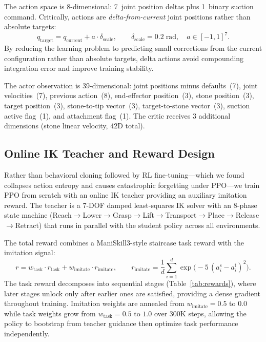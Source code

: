 \documentclass{article}
\begin{document}
The action space is 8-dimensional: 7~joint position deltas plus 1~binary suction command. Critically, actions are \emph{delta-from-current} joint positions rather than absolute targets:
\begin{equation}
q_{\mathrm{target}} = q_{\mathrm{current}} + a \cdot \delta_{\mathrm{scale}}, \qquad \delta_{\mathrm{scale}} = 0.2\;\mathrm{rad}, \quad a \in [-1, 1]^7.
\end{equation}
By reducing the learning problem to predicting small corrections from the current configuration rather than absolute targets, delta actions avoid compounding integration error and improve training stability.

The actor observation is 39-dimensional: joint positions minus defaults~(7), joint velocities~(7), previous action~(8), end-effector position~(3), stone position~(3), target position~(3), stone-to-tip vector~(3), target-to-stone vector~(3), suction active flag~(1), and attachment flag~(1). The critic receives 3 additional dimensions (stone linear velocity, 42D total).

\subsection{Online IK Teacher and Reward Design}

Rather than behavioral cloning followed by RL fine-tuning---which we found collapses action entropy and causes catastrophic forgetting under PPO---we train PPO from scratch with an online IK teacher providing an auxiliary imitation reward. The teacher is a 7-DOF damped least-squares IK solver with an 8-phase state machine (Reach$\to$Lower$\to$Grasp$\to$Lift$\to$Transport$\to$Place$\to$Release$\to$Retract) that runs in parallel with the student policy across all environments.

The total reward combines a ManiSkill3-style staircase task reward with the imitation signal:
\begin{equation}
r = w_{\mathrm{task}} \cdot r_{\mathrm{task}} + w_{\mathrm{imitate}} \cdot r_{\mathrm{imitate}}, \qquad r_{\mathrm{imitate}} = \frac{1}{d}\sum_{i=1}^{d}\exp\!\bigl({-}5\,(a_i^{\mathrm{s}} - a_i^{\mathrm{t}})^2\bigr).
\end{equation}
The task reward decomposes into sequential stages (Table~\ref{tab:rewards}), where later stages unlock only after earlier ones are satisfied, providing a dense gradient throughout training. Imitation weights are annealed from $w_{\mathrm{imitate}}{=}0.5$ to $0.0$ while task weights grow from $w_{\mathrm{task}}{=}0.5$ to $1.0$ over 300K steps, allowing the policy to bootstrap from teacher guidance then optimize task performance independently.
\end{document}
